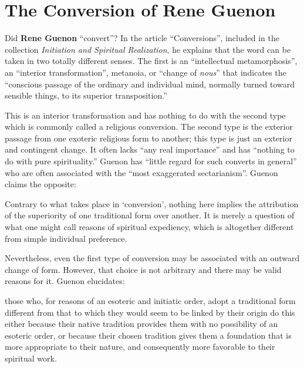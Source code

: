 \section{The Conversion of Rene Guenon}

\label{sec:ConversionGuenon}

Did \textbf{Rene Guenon} ``convert''? In the article ``Conversions'', included in the collection \emph{Initiation and Spiritual Realization}, he explains that the word can be taken in two totally different senses. The first is an ``intellectual metamorphosis'', an ``interior transformation'', metanoia, or ``change of \emph{nous}'' that indicates the ``conscious passage of the ordinary and individual mind, normally turned toward sensible things, to its superior transposition.''

This is an interior transformation and has nothing to do with the second type which is commonly called a religious conversion. The second type is the exterior passage from one exoteric religious form to another; this type is just an exterior and contingent change. It often lacks ``any real importance'' and has ``nothing to do with pure spirituality.'' Guenon has ``little regard for such converts in general'' who are often associated with the ``most exaggerated sectarianism''. Guenon claims the opposite:

\begin{quotex}
Contrary to what takes place in `conversion', nothing here implies the attribution of the superiority of one traditional form over another. It is merely a question of what one might call reasons of spiritual expediency, which is altogether different from simple individual preference.
\end{quotex}


Nevertheless, even the first type of conversion may be associated with an outward change of form. However, that choice is not arbitrary and there may be valid reasons for it. Guenon elucidates:

\begin{quotex}
those who, for reasons of an esoteric and initiatic order, adopt a traditional form different from that to which they would seem to be linked by their origin do this either because their native tradition provides them with no possibility of an esoteric order, or because their chosen tradition gives them a foundation that is more appropriate to their nature, and consequently more favorable to their spiritual work.
\end{quotex}


